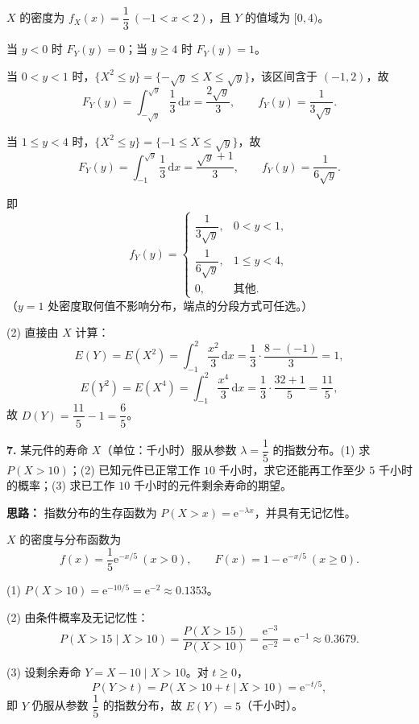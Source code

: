 $X$ 的密度为 $f_X(x)=\dfrac13\ (-1<x<2)$，且 $Y$ 的值域为 $[0,4)$。

当 $y<0$ 时 $F_Y(y)=0$；当 $y\geq4$ 时 $F_Y(y)=1$。

当 $0<y<1$ 时，$\{X^2\leq y\}=\{-\sqrt y\leq X\leq\sqrt y\}$，该区间含于 $(-1,2)$，故
\[
F_Y(y)=\int_{-\sqrt y}^{\sqrt y}\frac13\,\mathrm{d}x=\frac{2\sqrt y}{3},
\qquad f_Y(y)=\frac{1}{3\sqrt y}.
\]

当 $1\leq y<4$ 时，$\{X^2\leq y\}=\{-1\leq X\leq\sqrt y\}$，故
\[
F_Y(y)=\int_{-1}^{\sqrt y}\frac13\,\mathrm{d}x=\frac{\sqrt y+1}{3},
\qquad f_Y(y)=\frac{1}{6\sqrt y}.
\]

即
\[
f_Y(y)=\begin{cases}
\dfrac{1}{3\sqrt y}, & 0<y<1,\\[6pt]
\dfrac{1}{6\sqrt y}, & 1\leq y<4,\\[6pt]
0, & \text{其他}.
\end{cases}
\]
（$y=1$ 处密度取何值不影响分布，端点的分段方式可任选。）

(2) 直接由 $X$ 计算：
\[
E(Y)=E(X^2)=\int_{-1}^{2}\frac{x^2}{3}\,\mathrm{d}x=\frac13\cdot\frac{8-(-1)}{3}=1,
\]
\[
E(Y^2)=E(X^4)=\int_{-1}^{2}\frac{x^4}{3}\,\mathrm{d}x=\frac13\cdot\frac{32+1}{5}=\frac{11}{5},
\]
故 $D(Y)=\dfrac{11}{5}-1=\dfrac65$。

\else \answerarea[8] \fi%

\textbf{7.} 某元件的寿命 $X$（单位：千小时）服从参数 $\lambda=\dfrac15$ 的指数分布。(1) 求 $P(X>10)$；(2) 已知元件已正常工作 $10$ 千小时，求它还能再工作至少 $5$ 千小时的概率；(3) 求已工作 $10$ 千小时的元件剩余寿命的期望。

\ifshowsolutions%
\textbf{思路：} 指数分布的生存函数为 $P(X>x)=\mathrm{e}^{-\lambda x}$，并具有无记忆性。

$X$ 的密度与分布函数为
\[
f(x)=\frac15\mathrm{e}^{-x/5}\ (x>0),\qquad F(x)=1-\mathrm{e}^{-x/5}\ (x\geq0).
\]

(1) $P(X>10)=\mathrm{e}^{-10/5}=\mathrm{e}^{-2}\approx0.1353$。

(2) 由条件概率及无记忆性：
\[
P(X>15\mid X>10)=\frac{P(X>15)}{P(X>10)}
=\frac{\mathrm{e}^{-3}}{\mathrm{e}^{-2}}=\mathrm{e}^{-1}\approx0.3679.
\]

(3) 设剩余寿命 $Y=X-10\mid X>10$。对 $t\geq0$，
\[
P(Y>t)=P(X>10+t\mid X>10)=\mathrm{e}^{-t/5},
\]
即 $Y$ 仍服从参数 $\dfrac15$ 的指数分布，故 $E(Y)=5$（千小时）。

